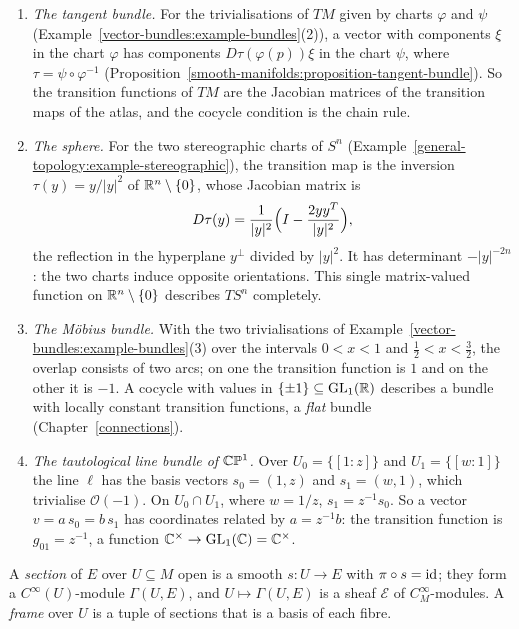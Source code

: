 \begin{example}\label{vector-bundles:example-cocycles}
\begin{enumerate}
\item \emph{The tangent bundle.} For the trivialisations of $TM$ given by charts $\varphi$ and $\psi$ (Example~\ref{vector-bundles:example-bundles}(2)), a vector with components
$\xi$ in the chart $\varphi$ has components $D\tau(\varphi(p))\xi$ in the chart $\psi$, where $\tau = \psi \circ \varphi^{-1}$ (Proposition~\ref{smooth-manifolds:proposition-tangent-bundle}).
So the transition functions of $TM$ are the Jacobian matrices of the transition maps of the atlas, and the cocycle condition is the chain rule.
\item \emph{The sphere.} For the two stereographic charts of $S^n$ (Example~\ref{general-topology:example-stereographic}), the transition map is the inversion
$\tau(y) = y/|y|^2$ of $\mathbb{R}^n \setminus \{0\}$, whose Jacobian matrix is
\[
D\tau(y) = \frac{1}{|y|^2}\Bigl(I - \frac{2yy^T}{|y|^2}\Bigr),
\]
the reflection in the hyperplane $y^\perp$ divided by $|y|^2$. It has determinant $-|y|^{-2n}$: the two charts induce opposite orientations. This single matrix-valued function
on $\mathbb{R}^n \setminus \{0\}$ describes $TS^n$ completely.
\item \emph{The M\"obius bundle.} With the two trivialisations of Example~\ref{vector-bundles:example-bundles}(3) over the intervals $0 < x < 1$ and $\frac12 < x < \frac32$, the overlap
consists of two arcs; on one the transition function is $1$ and on the other it is $-1$. A cocycle with values in $\{\pm1\} \subseteq \mathrm{GL}_1(\mathbb{R})$ describes a bundle with locally constant
transition functions, a \emph{flat} bundle (Chapter~\ref{connections}).
\item \emph{The tautological line bundle of $\mathbb{C}\mathbb{P}^1$.} Over $U_0 = \{[1 : z]\}$ and $U_1 = \{[w : 1]\}$ the line $\ell$ has the basis vectors $s_0 = (1, z)$ and $s_1 = (w, 1)$, which
trivialise $\mathcal{O}(-1)$. On $U_0 \cap U_1$, where $w = 1/z$, $s_1 = z^{-1}s_0$. So a vector $v = a\,s_0 = b\,s_1$ has coordinates related by $a = z^{-1}b$: the transition function
is $g_{01} = z^{-1}$, a function $\mathbb{C}^\times \to \mathrm{GL}_1(\mathbb{C}) = \mathbb{C}^\times$.
\end{enumerate}
\end{example}

\begin{definition}\label{vector-bundles:definition-sections}
A \emph{section} of $E$ over $U \subseteq M$ open is a smooth $s \colon U \to E$ with $\pi \circ s = \mathrm{id}$; they form a $C^\infty(U)$-module $\Gamma(U, E)$, and $U \mapsto \Gamma(U, E)$ is a sheaf
$\mathcal{E}$ of $C^\infty_M$-modules. A \emph{frame} over $U$ is a tuple of sections that is a basis of each fibre.
\end{definition}


